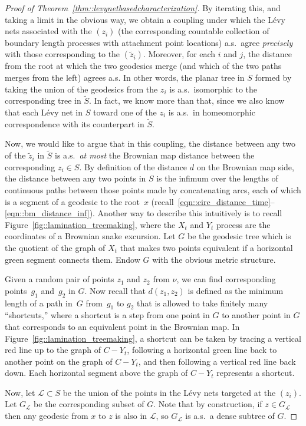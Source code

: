 \documentclass[10pt]{amsart}
\let\mathcal\mathscr
\theoremstyle{plain}
\numberwithin{theorem}{section}
\theoremstyle{definition}
\newcommand{\CL}{{\mathcal L}}
\let\wt\widetilde
\begin{document}
\begin{proof}[Proof of Theorem~\ref{thm::levynetbasedcharacterization}]
By iterating this, and taking a limit in the obvious way, we obtain a coupling under which the Lévy nets associated with the $(z_i)$ (\ie the corresponding countable collection of boundary length processes with attachment point locations) a.s.\ agree \emph{precisely} with those corresponding to the $(\wt{z}_i)$. Moreover, for each $i$ and $j$, the distance from the root at which the two geodesics merge (and which of the two paths merges from the left) agrees a.s. In other words, the planar tree in $S$ formed by taking the union of the geodesics from the $z_i$ is a.s.\ isomorphic to the corresponding tree in $\wt{S}$. In fact, we know more than that, since we also know that each Lévy net in $S$ toward one of the $z_i$ is a.s.\ in homeomorphic correspondence with its counterpart in $\wt{S}$.

Now, we would like to argue that in this coupling, the distance between any two of the $\wt{z}_i$ in $\wt{S}$ is a.s.\ \emph{at most} the Brownian map distance between the corresponding $z_i \in S$. By definition of the distance $d$ on the Brownian map side, the distance between any two points in $S$ is the infimum over the lengths of continuous paths between those points made by concatenating arcs, each of which is a segment of a geodesic to the root~$x$ (recall~\eqref{eqn::circ_distance_time}--\eqref{eqn::bm_distance_inf}). Another way to describe this intuitively is to recall Figure~\ref{fig::lamination_treemaking}, where the $X_t$ and $Y_t$ process are the coordinates of a Brownian snake excursion. Let $G$ be the geodesic tree which is the quotient of the graph of $X_t$ that makes two points equivalent if a horizontal green segment connects them. Endow $G$ with the obvious metric structure.

Given a random pair of points $z_1$ and $z_2$ from $\nu$, we can find corresponding points~$g_1$ and~$g_2$ in $G$. Now recall that $d(z_1, z_2)$ is defined as the minimum length of a path in~$G$ from~$g_1$ to $g_2$ that is allowed to take finitely many ``shortcuts,'' where a shortcut is a step from one point in $G$ to another point in $G$ that corresponds to an equivalent point in the Brownian map. In Figure~\ref{fig::lamination_treemaking}, a shortcut can be taken by tracing a vertical red line up to the graph of $C- Y_t$, following a horizontal green line back to another point on the graph of $C-Y_t$, and then following a vertical red line back down. Each horizontal segment above the graph of $C-Y_t$ represents a shortcut.

Now, let $\mathcal L \subset S$ be the union of the points in the Lévy nets targeted at the $(z_i)$. Let $G_\mathcal L$ be the corresponding subset of $G$. Note that by construction, if $z \in G_\CL$ then any geodesic from $x$ to $z$ is also in $\mathcal L$, so $G_\CL$ is a.s.\ a dense subtree of $G$.


\end{proof}
\end{document}
